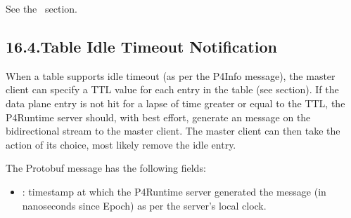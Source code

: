 \documentclass[11pt]{article}
\begin{document}
{%
\noindent{}See the~ section.%

\subsection{16.4.\hspace*{0.5em}Table Idle Timeout Notification}\label{sec-table-idle-timeout-notification}%

\noindent{}When a table supports idle timeout (as per the P4Info message), the master
client can specify a TTL value for each entry in the table (see
 section). If the data plane entry is not hit
for a lapse of time greater or equal to the TTL, the P4Runtime server should,
with best effort, generate an  message on the
 bidirectional stream to the master client. The master client can
then take the action of its choice, most likely remove the idle entry.%

The  Protobuf message has the following fields:%

\begin{itemize}%

\item{}
: timestamp at which the P4Runtime server generated the message (in
nanoseconds since Epoch) as per the server's local clock.%


\end{itemize}}
\end{document}
